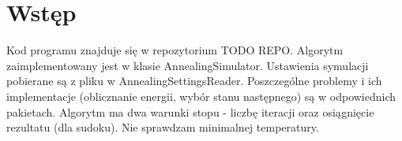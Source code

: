 \section{Wstęp}
Kod programu znajduje się w repozytorium TODO REPO.
Algorytm zaimplementowany jest w klasie AnnealingSimulator. Ustawienia symulacji pobierane są z pliku w AnnealingSettingsReader. Poszczególne problemy i ich implementacje (oblicznanie energii, wybór stanu następnego) są w odpowiednich pakietach.
Algorytm ma dwa warunki stopu - liczbę iteracji oraz osiągnięcie rezultatu (dla sudoku). Nie sprawdzam minimalnej temperatury.
